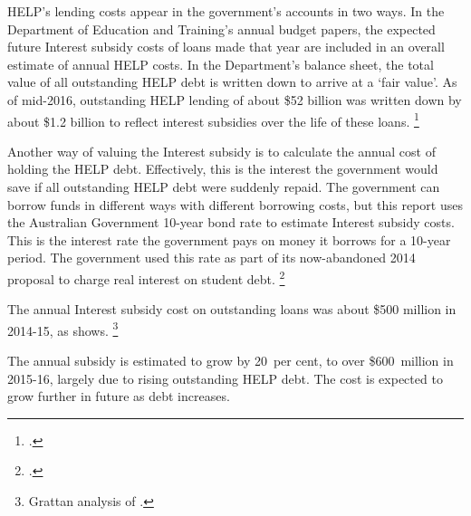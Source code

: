 \documentclass[embargoed]{grattan}
\begin{document}
\gls{HELP}'s lending costs appear in the government's accounts in two ways.
In the Department of Education and Training's annual budget papers, the expected future \gls{Interest subsidy} costs of loans made that year are included in an overall estimate of annual \gls{HELP} costs.
In the Department's balance sheet, the total value of all outstanding \gls{HELP} debt is written down to arrive at a `fair value'.
As of mid-2016, outstanding \gls{HELP} lending of about \$52 billion was written down by about \$1.2 billion to reflect interest subsidies over the life of these loans.%
\footcite[][176]{Education2016Annualreport}

Another way of valuing the \gls{Interest subsidy} is to calculate the annual cost of holding the \gls{HELP} debt.
Effectively, this is the interest the government would save if all outstanding \gls{HELP} debt were suddenly repaid.
The government can borrow funds in different ways with different borrowing costs, but this report uses the Australian Government 10-year bond rate to estimate \gls{Interest subsidy} costs.
This is the interest rate the government pays on money it borrows for a 10-year period.
The government used this rate as part of its now-abandoned 2014 proposal to charge real interest on student debt.%
\footcite{Australia2014HigherEducationResearch}

The annual \gls{Interest subsidy} cost on outstanding loans was about \$500 million in 2014-15, as  shows.%
\footnote{Grattan analysis of \textcites{ABS2016ConsumerPriceIndex}{RBA-2015-f2Capitalmarketyields}{RBA2016F21Capitalmarket}.} 

The annual subsidy is estimated to grow by 20~per cent, to over \$600~million in 2015-16, largely due to rising outstanding \gls{HELP} debt.
The cost is expected to grow further in future as debt increases.
\end{document}
